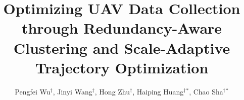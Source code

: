\documentclass[sigconf]{acmart}
\begin{document}
\title{Optimizing UAV Data Collection through Redundancy-Aware Clustering and Scale-Adaptive Trajectory Optimization}


\author{Pengfei Wu$^\dagger$, Jinyi Wang$^\dagger$, Hong Zhu$^\dagger$, Haiping Huang$^\dagger$$^*$, Chao Sha$^\dagger$$^*$}








\renewcommand{\shortauthors}{Wu et al.}

\end{document}
